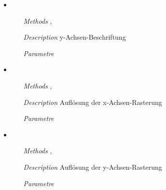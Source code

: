 \begin{itemize}
\item {}
\begin{enumerate}
\item[\textit{Methods}] ,
\item[\textit{Description}] y-Achsen-Beschriftung
\item[\textit{Parametre}] 
\end{enumerate}

\item {}
\begin{enumerate}
\item[\textit{Methods}] ,
\item[\textit{Description}] Aufl\"osung der x-Achsen-Rasterung
\item[\textit{Parametre}] 
\end{enumerate}

\item {}
\begin{enumerate}
\item[\textit{Methods}] ,
\item[\textit{Description}] Aufl\"osung der y-Achsen-Rasterung
\item[\textit{Parametre}] 
\end{enumerate}

\end{itemize}


\newpage

